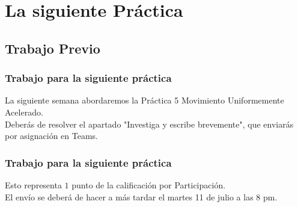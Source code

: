 \documentclass[14pt]{beamer}
\begin{document}
\section{La siguiente Práctica}
\subsection{Trabajo Previo}

\begin{frame}
\frametitle{Trabajo para la siguiente práctica}
La siguiente semana abordaremos la Práctica 5 Movimiento Uniformemente Acelerado.
\\
\bigskip
Deberás de resolver el apartado "Investiga y escribe brevemente", que enviarás por asignación en Teams.
\end{frame}
\begin{frame}
\frametitle{Trabajo para la siguiente práctica}
Esto representa $1$ punto de la calificación por Participación.
\\
\bigskip
\pause
El envío se deberá de hacer a más tardar el martes 11 de julio a las 8 pm.
\end{frame}


\end{document}
